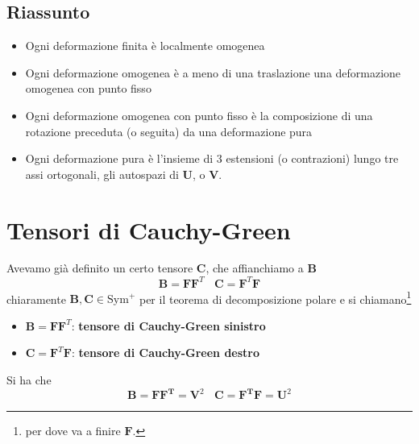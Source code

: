 \documentclass[10pt,a4paper,twoside]{book}
\begin{document}
\subsection{Riassunto}
\begin{itemize}
\item Ogni deformazione finita è localmente omogenea
\item Ogni deformazione omogenea è a meno di una traslazione una deformazione omogenea con punto fisso
\item Ogni deformazione omogenea con punto fisso è la composizione di una rotazione preceduta (o seguita) da una deformazione pura
\item Ogni deformazione pura è l'insieme di $3$ estensioni (o contrazioni) lungo tre assi ortogonali, gli autospazi di $\mathbf{U}$, o $\mathbf{V}$.
\end{itemize}


\section{Tensori di Cauchy-Green}

Avevamo già definito un certo tensore $\mathbf{C}$, che affianchiamo a $\mathbf{B}$
\begin{equation*}
\boxed{\mathbf{B} =\mathbf{FF}^{T}} \ \ \ \ \boxed{\mathbf{C} =\mathbf{F}^{T}\mathbf{F}}
\end{equation*}
chiaramente $\mathbf{B} ,\mathbf{C} \in \mathrm{Sym}^{+}$ per il teorema di decomposizione polare e si chiamano\footnote{per dove va a finire $\mathbf{F}$.}
\begin{itemize}
\item $\mathbf{B} =\mathbf{FF}^{T}$: \textbf{tensore di Cauchy-Green sinistro}
\item $\mathbf{C} =\mathbf{F}^{T}\mathbf{F}$: \textbf{tensore di Cauchy-Green destro}
\end{itemize}

Si ha che
\begin{equation*}
\boxed{\mathbf{B} =\mathbf{FF^{T}} =\mathbf{V}^{2}} \ \ \ \ \boxed{\mathbf{C} =\mathbf{F^{T} F} =\mathbf{U}^{2}}
\end{equation*}
\end{document}
